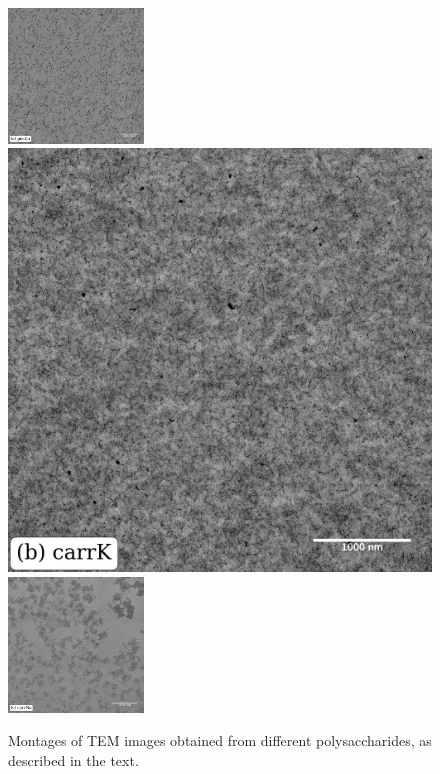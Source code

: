 \begin{figure}[!ht]
    \includegraphics[width=0.32\textwidth]{Figures/chapter-temsaxs/pectin1_1045_homogeneous_scalebar_label.jpeg}
    \hspace{0.5pt}
    \includegraphics[width=0.32\linewidth]{Figures/chapter-temsaxs/carrageenan_K_Montage_833_scalebarFixed_normalized_label.jpeg}
    \hspace{0.5pt}
    \includegraphics[width=0.32\textwidth]{Figures/chapter-temsaxs/carrageenan_Na_Montage_851_scalebar_label.jpeg}
    \caption{Montages of TEM images obtained from different polysaccharides, as described in the text.}\label{fig:fig1}
\end{figure}



